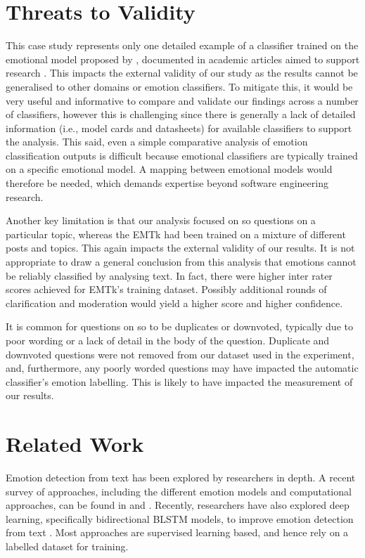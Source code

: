 \section{Threats to Validity} 

This case study represents only one detailed example of a classifier trained on the emotional model proposed by \citet{shaver1987}, documented in academic articles aimed to support research \citep{Novielli:2015vda, novielli2018, calefato2017, calefato2018}.  This impacts the external validity of our study as the results cannot be generalised to other domains or emotion classifiers. To mitigate this, it would be very useful and informative to compare and validate our findings across a number of classifiers, however this is challenging since there is generally a lack of detailed information (i.e., model cards and datasheets) for available classifiers to support the analysis. This said, even a simple comparative analysis of emotion classification outputs is difficult because emotional classifiers are typically trained on a specific emotional model. A mapping between emotional models would therefore be needed, which demands expertise beyond software engineering research.

Another key limitation is that our analysis focused on \gls{so} questions on a particular topic, whereas the EMTk had been trained on a mixture of different posts and topics. This again impacts the external validity of our results. It is not appropriate to draw a general conclusion from this analysis that emotions cannot be reliably classified by analysing text. In fact, there were higher inter rater scores achieved for EMTk's training dataset. Possibly additional rounds of clarification and moderation would yield a higher score and higher confidence.

It is common for questions on \gls{so} to be duplicates or downvoted, typically due to poor wording or a lack of detail in the body of the question. Duplicate and downvoted questions were not removed from our dataset used in the experiment, and, furthermore, any poorly worded questions may have impacted the automatic classifier's emotion labelling. This is likely to have impacted the measurement of our results.

\section{Related Work}

Emotion detection from text has been explored by researchers in depth. A recent survey of approaches, including the different emotion models and computational approaches, can be found in \citet{Sailunaz2018a} and \citet{Alswaidan2020}. Recently, researchers have also explored deep learning, specifically bidirectional BLSTM models, to improve emotion detection from text \citep{Batbaatar2019}.  Most approaches are supervised learning based, and hence rely on a labelled dataset for training.

